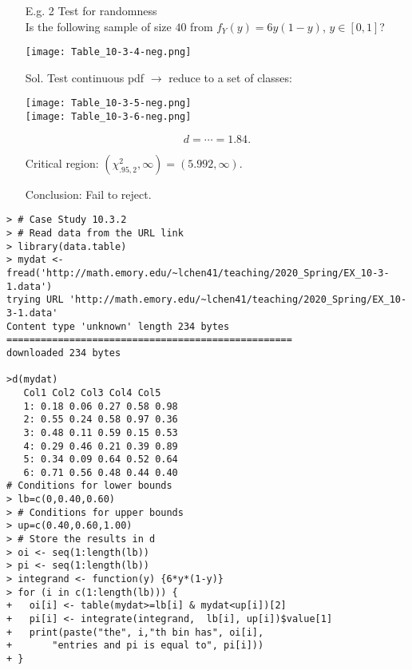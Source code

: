 \begin{frame}
\begin{enumerate}
\item[E.g. 2] Test for randomness\\[1em]
Is the following sample of size $40$ from $f_Y(y)=6y(1-y)$, $y\in[0,1]$?
\vfill
\begin{center}
\texttt{[image: Table\_10-3-4-neg.png]}
\end{center}
\end{enumerate}
\end{frame}
\begin{frame}

\begin{enumerate}
\item[Sol.] Test continuous pdf $\rightarrow$ reduce to a set of classes:
\begin{center}
\texttt{[image: Table\_10-3-5-neg.png]}\\ \pause
\texttt{[image: Table\_10-3-6-neg.png]} \pause
\end{center}
\[
d = \cdots =1.84.
\]
\item[] Critical region: $\left(\chi_{.95,2}^2,\infty \right)=(5.992,\infty)$.
\item[] Conclusion: Fail to reject.
\end{enumerate}
\end{frame}
\begin{frame}[fragile]
	\begin{lstlisting}
> # Case Study 10.3.2
> # Read data from the URL link
> library(data.table)
> mydat <- fread('http://math.emory.edu/~lchen41/teaching/2020_Spring/EX_10-3-1.data')
trying URL 'http://math.emory.edu/~lchen41/teaching/2020_Spring/EX_10-3-1.data'
Content type 'unknown' length 234 bytes
==================================================
downloaded 234 bytes

>d(mydat)
   Col1 Col2 Col3 Col4 Col5
   1: 0.18 0.06 0.27 0.58 0.98
   2: 0.55 0.24 0.58 0.97 0.36
   3: 0.48 0.11 0.59 0.15 0.53
   4: 0.29 0.46 0.21 0.39 0.89
   5: 0.34 0.09 0.64 0.52 0.64
   6: 0.71 0.56 0.48 0.44 0.40
# Conditions for lower bounds
> lb=c(0,0.40,0.60)
> # Conditions for upper bounds
> up=c(0.40,0.60,1.00)
> # Store the results in d
> oi <- seq(1:length(lb))
> pi <- seq(1:length(lb))
> integrand <- function(y) {6*y*(1-y)}
> for (i in c(1:length(lb))) {
+   oi[i] <- table(mydat>=lb[i] & mydat<up[i])[2]
+   pi[i] <- integrate(integrand,  lb[i], up[i])$value[1]
+   print(paste("the", i,"th bin has", oi[i],
+       "entries and pi is equal to", pi[i]))
+ }
	\end{lstlisting}
\end{frame}
